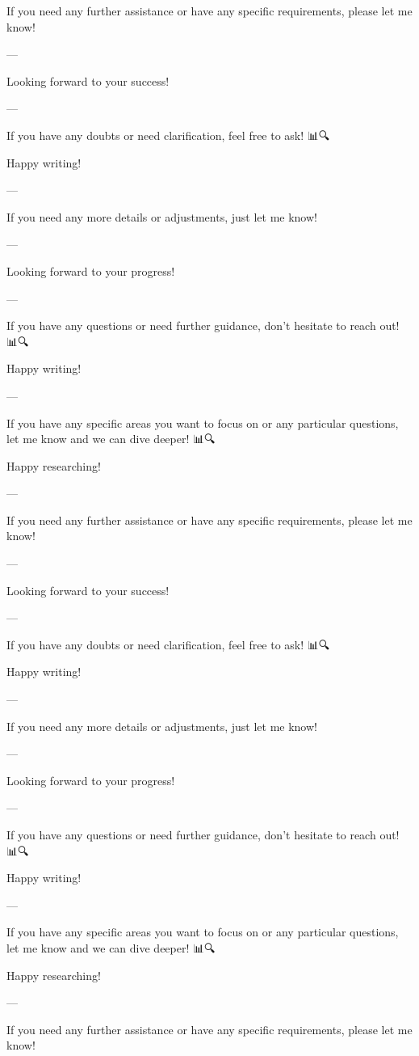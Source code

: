 If you need any further assistance or have any specific requirements, please let me know! 🙌

--- 

Looking forward to your success! 🚀🌟

--- 

If you have any doubts or need clarification, feel free to ask! 📊🔍

Happy writing! 📝✨

--- 

If you need any more details or adjustments, just let me know! 🙌

--- 

Looking forward to your progress! 🚀🌟

--- 

If you have any questions or need further guidance, don't hesitate to reach out! 📊🔍

Happy writing! 📝✨

--- 

If you have any specific areas you want to focus on or any particular questions, let me know and we can dive deeper! 📊🔍

Happy researching! 📝🚀

--- 

If you need any further assistance or have any specific requirements, please let me know! 🙌

--- 

Looking forward to your success! 🚀🌟

--- 

If you have any doubts or need clarification, feel free to ask! 📊🔍

Happy writing! 📝✨

--- 

If you need any more details or adjustments, just let me know! 🙌

--- 

Looking forward to your progress! 🚀🌟

--- 

If you have any questions or need further guidance, don't hesitate to reach out! 📊🔍

Happy writing! 📝✨

--- 

If you have any specific areas you want to focus on or any particular questions, let me know and we can dive deeper! 📊🔍

Happy researching! 📝🚀

--- 

If you need any further assistance or have any specific requirements, please let me know! 🙌

